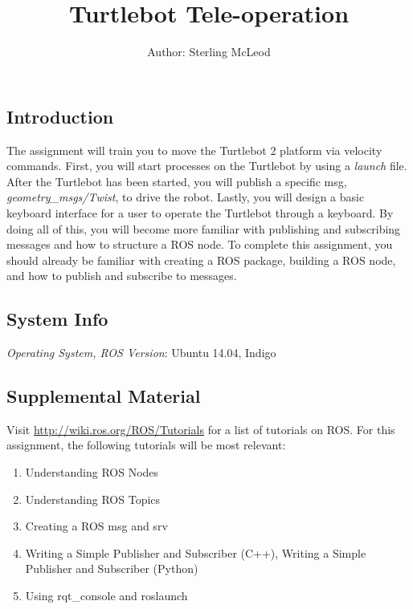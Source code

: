 \documentclass[12pt]{article}
\begin{document}
 
\title{Turtlebot Tele-operation}
\author{Author: Sterling McLeod}
\maketitle

\subsection*{Introduction}

The assignment will train you to move the Turtlebot 2 platform via velocity commands. First, you will start processes on the Turtlebot by using a \emph{launch} file. After the Turtlebot has been started, you will publish a specific msg, \emph{geometry\_msgs/Twist}, to drive the robot. Lastly, you will design a basic keyboard interface for a user to operate the Turtlebot through a keyboard. By doing all of this, you will become more familiar with publishing and subscribing messages and how to structure a ROS node. To complete this assignment, you should already be familiar with creating a ROS package, building a ROS node, and how to publish and subscribe to messages.



\subsection*{System Info}
\emph{Operating System, ROS Version}: Ubuntu 14.04, Indigo

\subsection*{Supplemental Material}

Visit \href{http://wiki.ros.org/ROS/Tutorials}{http://wiki.ros.org/ROS/Tutorials} for a list of tutorials on ROS. For this assignment, the following tutorials will be most relevant:

\begin{enumerate}
\item Understanding ROS Nodes
\item Understanding ROS Topics
\item Creating a ROS msg and srv
\item Writing a Simple Publisher and Subscriber (C++), Writing a Simple Publisher and Subscriber (Python)
\item Using rqt\_console and roslaunch
\end{enumerate}
\end{document}
